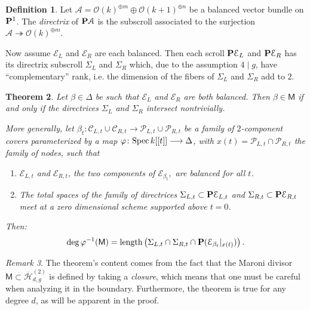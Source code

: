 \documentclass[reqno, 10 pt]{article}
\newtheorem{thm}{Theorem}
\theoremstyle{definition}
\newtheorem{defn}[thm]{Definition}
\theoremstyle{remark}
\newtheorem{rmk}[thm]{Remark}
\numberwithin{equation}{section}
\numberwithin{thm}{section}
\numberwithin{prop}{section}
\numberwithin{lem}{section}
\numberwithin{cor}{section}
\numberwithin{conj}{section}
\numberwithin{defn}{section}
\renewcommand{\H}{\mathcal H}
\newcommand{\Hdgnt}{\overline{\H}_{d,g}^{(2)}}
\renewcommand{\to}{\longrightarrow}
\newcommand{\sfM}{{\mathsf M}}
\newcommand{\cA}{{\mathcal A}}
\newcommand{\cC}{{\mathcal C}}
\newcommand{\cE}{{\mathcal E}}
\newcommand{\cO}{{\mathcal O}}
\newcommand{\cP}{{\mathcal P}}
\renewcommand{\P}{{\bf P}}
\newcommand {\from}{{\colon}}
\newcommand{\onto}{\twoheadrightarrow}
\renewcommand{\H}{{\mathcal{H}}}
\newcommand{\Spec}{{\text{\rm Spec}\,}}
\newcommand {\length}{{\rm length}}
\begin{document}
\begin{defn}\label{directrix}
Let $\cA = \cO(k)^{\oplus m} \oplus \cO(k+1)^{\oplus n}$ be a balanced vector bundle on $\P^{1}$. The {\sl directrix} of $\P \cA$ is the subscroll associated to the surjection $\cA \onto \cO(k)^{\oplus m}$.
\end{defn}



Now assume $\cE_{L}$ and $\cE_{R}$ are each balanced. Then each scroll $\P\cE_{L}$ and $\P\cE_{R}$ has its directrix subscroll $\Sigma_{L}$ and $\Sigma_{R}$ which, due to the assumption $4 \mid g$, have ``complementary'' rank, i.e. the dimension of the fibers of $\Sigma_{L}$ and $\Sigma_{R}$ add to $2$.

\begin{thm}\label{directrixmeet}
Let $\beta \in \Delta$ be such that $\cE_{L}$ and $\cE_{R}$ are both balanced. Then $\beta \in \sfM$ if and only if the directrices $\Sigma_{L}$ and $\Sigma_{R}$ intersect nontrivially. 

More generally, let $\beta_{t} \from \cC_{L,t} \cup \cC_{R,t} \to \cP_{L,t} \cup \cP_{R,t}$ be a family of $2$-component covers parameterized by a map $\varphi \from \Spec k[[t]] \to \Delta$, with $x(t) = \cP_{L,t} \cap \cP_{R,t}$ the family of nodes, such that
\begin{enumerate}
 \item $\cE_{L,t}$ and $\cE_{R,t}$, the two components of $\cE_{\beta_{t}},$ are balanced for all $t$.
 \item The total spaces of the family of directrices $\Sigma_{L,t} \subset \P \cE_{L,t}$ and $\Sigma_{R,t} \subset \P \cE_{R,t}$ meet at a zero dimensional scheme supported above $t=0$.
\end{enumerate}
Then: $$\deg \varphi^{-1}(\sfM) = \length \left(\Sigma_{L,t} \cap \Sigma_{R,t} \cap \P (\cE_{\beta_{t}}|_{x(t)})\right).$$
\end{thm}

\begin{rmk}
The theorem's content comes from the fact that the Maroni divisor $\sfM \subset \Hdgnt$ is defined by taking a {\sl closure}, which means that one must be careful when analyzing it in the boundary. Furthermore, the theorem is true for any degree $d$, as will be apparent in the proof.
\end{rmk}
\end{document}
